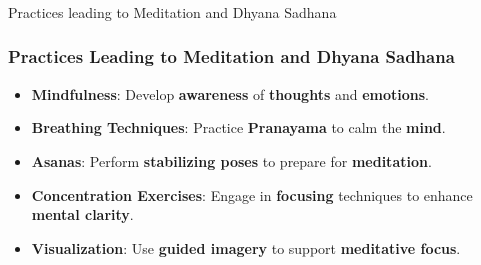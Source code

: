 \begin{frame}[fragile]\frametitle{}
\begin{center}
{\Large Practices leading to Meditation and Dhyana Sadhana }
\end{center}
\end{frame}

\begin{frame}[fragile]\frametitle{Practices Leading to Meditation and Dhyana Sadhana}

      \begin{itemize}
        \item \textbf{Mindfulness}: Develop \textbf{awareness} of \textbf{thoughts} and \textbf{emotions}.
        \item \textbf{Breathing Techniques}: Practice \textbf{Pranayama} to calm the \textbf{mind}.
        \item \textbf{Asanas}: Perform \textbf{stabilizing poses} to prepare for \textbf{meditation}.
        \item \textbf{Concentration Exercises}: Engage in \textbf{focusing} techniques to enhance \textbf{mental clarity}.
        \item \textbf{Visualization}: Use \textbf{guided imagery} to support \textbf{meditative focus}.
      \end{itemize}
 
\end{frame}
